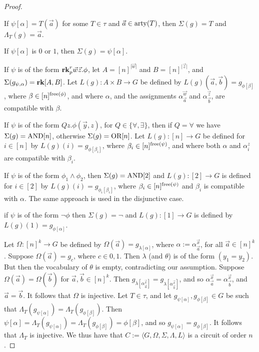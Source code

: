\documentclass[../paper.tex]{subfiles}
\begin{document}
\begin{proof}
  \begin{myitemize}
  \item If $\psi[\alpha] = T(\vec{a})$ for some $T \in \tau$ and $\vec{a} \in
    \mathrm{arty}(T)$, then $\Sigma (g) = T$ and $\Lambda_T (g) = \vec{a}$.
  \item If $\psi[\alpha]$ is $0$ or $1$, then $\Sigma (g) = \psi[\alpha]$.
  \item If $\psi$ is of the form $\text{\textbf{rk}}^r_p \vec{w} \vec{z}. \phi$, let $A =
    [n]^{\vert \vec{w}\vert}$ and $B = [n]^{\vert \vec{z}\vert}$, and $\Sigma
    (g_{\psi, \alpha}) = \text{\textbf{rk}}[A, B]$. Let $L(g) : A \times B \rightarrow G$ be
    defined by $L(g)(\vec{a},\vec{b}) = g_{\phi[\beta]}$, where $\beta \in
    [n]^{\mathrm{free}(\phi)}$, and where $\alpha$, and the assignments
    $\alpha^{\vec{w}}_{\vec{a}}$ and $\alpha^{\vec{z}}_{\vec{b}}$, are
    compatible with $\beta$.
  \item If $\psi$ is of the form $Q z . \phi(\vec{y}, z)$, for $Q \in \{\forall,
    \exists\}$, then if $Q = \forall$ we have $\Sigma (g) = \text{\upshape AND}[n]$,
    otherwise $\Sigma (g) = \text{\upshape OR}[n]$. Let $L(g) : [n] \rightarrow G$ be defined
    for $i \in [n]$ by $L(g)(i) = g_{\phi[\beta_i]}$, where $\beta_i \in
    [n]^{\mathrm{free}(\psi)}$, and where both $\alpha$ and $\alpha^{z}_{i}$ are
    compatible with $\beta_i$.
  \item If $\psi$ is of the form $\phi_1 \land \phi_2$, then $\Sigma(g) =
    \text{\upshape AND}[2]$ and $L(g) : [2] \rightarrow G$ is defined for $i \in [2]$ by
    $L(g)(i) = g_{\phi_i[\beta_i]}$, where $\beta_i \in [n]^{\mathrm{free}(\psi)}$ and
    $\beta_i$ is compatible with $\alpha$. The same approach is used in the
    disjunctive case.
  \item if $\psi$ is of the form $\neg \phi$ then $\Sigma (g) = \neg$ and $L(g):
    [1] \rightarrow G$ is defined by $L(g)(1) = g_{\phi[\alpha]}$.
  \end{myitemize}

  Let $\Omega : [n]^k \rightarrow G$ be defined by $\Omega (\vec{a}) =
  g_{\lambda [\alpha]}$, where $\alpha := \alpha^{\vec{x}}_{\vec{a}}$, for all
  $\vec{a} \in [n]^k$. Suppose $\Omega (\vec{a}) = g_c$, where $ c \in {0,1}$.
  Then $\lambda$ (and $\theta$) is of the form $(y_1 = y_2)$. But then the
  vocabulary of $\theta$ is empty, contradicting our assumption. Suppose $\Omega
  (\vec{a}) = \Omega(\vec{b})$ for $\vec{a}, \vec{b} \in [n]^k$. Then
  $g_{\lambda[\alpha^{\vec{x}}_{\vec{a}}]} =
  g_{\lambda[\alpha^{\vec{x}}_{\vec{b}}]}$, and so $\alpha^{\vec{x}}_{\vec{a}} =
  \alpha^{\vec{x}}_{\vec{b}}$, and $\vec{a} = \vec{b}$. It follows that $\Omega$
  is injective. Let $T \in \tau$, and let $g_{\psi[\alpha]}, g_{\phi[\beta]} \in
  G$ be such that $\Lambda_T (g_{\psi[\alpha]}) = \Lambda_T (g_{\phi[\beta]})$.
  Then $\psi[\alpha] = \Lambda_T (g_{\psi[\alpha]}) = \Lambda_T
  (g_{\phi[\beta]}) = \phi[\beta]$, and so $g_{\psi[\alpha]} = g_{\phi[\beta]}$.
  It follows that $\Lambda_T$ is injective. We thus have that $C := \langle G,
  \Omega, \Sigma, \Lambda, L \rangle$ is a circuit of order $n$.


\end{proof}
\end{document}
